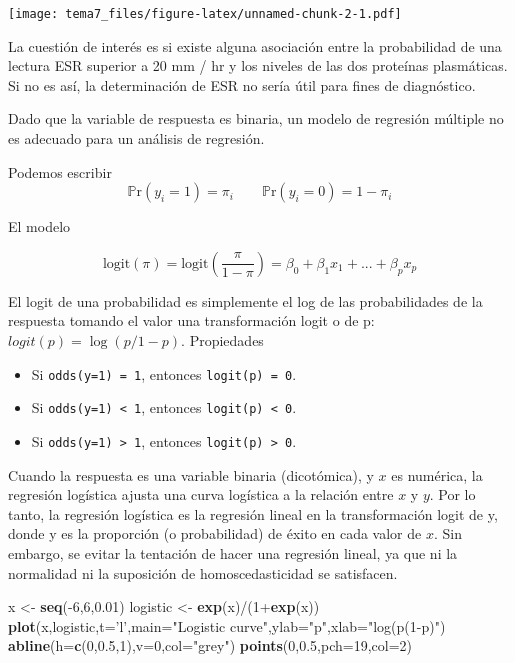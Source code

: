 \documentclass[]{article}
\def\tightlist{}
\newenvironment{Shaded}{\begin{snugshade}}{\end{snugshade}}
\newcommand{\KeywordTok}[1]{\textcolor[rgb]{0.13,0.29,0.53}{\textbf{{#1}}}}
\newcommand{\DataTypeTok}[1]{\textcolor[rgb]{0.13,0.29,0.53}{{#1}}}
\newcommand{\DecValTok}[1]{\textcolor[rgb]{0.00,0.00,0.81}{{#1}}}
\newcommand{\FloatTok}[1]{\textcolor[rgb]{0.00,0.00,0.81}{{#1}}}
\newcommand{\StringTok}[1]{\textcolor[rgb]{0.31,0.60,0.02}{{#1}}}
\newcommand{\NormalTok}[1]{{#1}}
\numberwithin{equation}{section}
\begin{document}
\texttt{[image: tema7\_files/figure-latex/unnamed-chunk-2-1.pdf]}

La cuestión de interés es si existe alguna asociación entre la
probabilidad de una lectura ESR superior a 20 mm / hr y los niveles de
las dos proteínas plasmáticas. Si no es así, la determinación de ESR no
sería útil para fines de diagnóstico.

Dado que la variable de respuesta es binaria, un modelo de regresión
múltiple no es adecuado para un análisis de regresión.

Podemos escribir \[
\mathbb{P}\mbox{r}(y_i=1)=\pi_i \qquad \mathbb{P}\mbox{r}(y_i=0)=1-\pi_i
\]

El modelo

\[
  \mbox{logit}(\pi) = \mbox{logit}\left(\frac{\pi}{1-\pi}\right) = \beta_0 + \beta_1x_1 + ... + \beta_p x_p
\]

El logit de una probabilidad es simplemente el log de las probabilidades
de la respuesta tomando el valor una transformación logit o de p:
\(logit(p) = \log(p/1-p)\). Propiedades

\begin{itemize}
\tightlist
\item
  Si \texttt{odds(y=1)\ =\ 1}, entonces \texttt{logit(p)\ =\ 0}.
\item
  Si \texttt{odds(y=1)\ \textless{}\ 1}, entonces
  \texttt{logit(p)\ \textless{}\ 0}.
\item
  Si \texttt{odds(y=1)\ \textgreater{}\ 1}, entonces
  \texttt{logit(p)\ \textgreater{}\ 0}.
\end{itemize}

Cuando la respuesta es una variable binaria (dicotómica), y \(x\) es
numérica, la regresión logística ajusta una curva logística a la
relación entre \(x\) y \(y\). Por lo tanto, la regresión logística es la
regresión lineal en la transformación logit de y, donde y es la
proporción (o probabilidad) de éxito en cada valor de \(x\). Sin
embargo, se evitar la tentación de hacer una regresión lineal, ya que ni
la normalidad ni la suposición de homoscedasticidad se satisfacen.

\begin{Shaded}
\begin{Highlighting}[]
\NormalTok{x <-}\StringTok{ }\KeywordTok{seq}\NormalTok{(-}\DecValTok{6}\NormalTok{,}\DecValTok{6}\NormalTok{,}\FloatTok{0.01}\NormalTok{)}
\NormalTok{logistic <-}\StringTok{ }\KeywordTok{exp}\NormalTok{(x)/(}\DecValTok{1}\NormalTok{+}\KeywordTok{exp}\NormalTok{(x))}
\KeywordTok{plot}\NormalTok{(x,logistic,}\DataTypeTok{t=}\StringTok{'l'}\NormalTok{,}\DataTypeTok{main=}\StringTok{"Logistic curve"}\NormalTok{,}\DataTypeTok{ylab=}\StringTok{"p"}\NormalTok{,}\DataTypeTok{xlab=}\StringTok{"log(p(1-p)"}\NormalTok{)}
\KeywordTok{abline}\NormalTok{(}\DataTypeTok{h=}\KeywordTok{c}\NormalTok{(}\DecValTok{0}\NormalTok{,}\FloatTok{0.5}\NormalTok{,}\DecValTok{1}\NormalTok{),}\DataTypeTok{v=}\DecValTok{0}\NormalTok{,}\DataTypeTok{col=}\StringTok{"grey"}\NormalTok{)}
\KeywordTok{points}\NormalTok{(}\DecValTok{0}\NormalTok{,}\FloatTok{0.5}\NormalTok{,}\DataTypeTok{pch=}\DecValTok{19}\NormalTok{,}\DataTypeTok{col=}\DecValTok{2}\NormalTok{)}
\end{Highlighting}
\end{Shaded}
\end{document}
